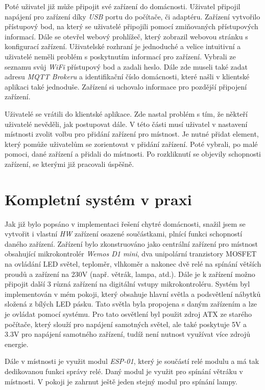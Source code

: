 Poté uživatel již může připojit své zařízení do domácnosti.
Uživatel připojil napájení pro zařízení díky \emph{USB} portu do počítače, či adaptéru.
Zařízení vytvořilo přístupový bod, na který se uživatelé připojili pomocí zmiňovaných přístupových informací.
Dále se otevřel webový prohlížeč, který zobrazil webovou stránku s konfigurací zařízení.
Uživatelské rozhraní je jednoduché a velice intuitivní a uživatelé neměli problém s poskytnutím informací pro zařízení.
Vybrali ze seznamu svůj \emph{WiFi} přístupový bod a zadali heslo.
Dále zde museli také zadat adresu \emph{MQTT Brokeru} a identifikační číslo domácnosti, které našli v klientské aplikaci také jednoduše.
Zařízení si uchovalo informace pro pozdější připojení zařízení.

Uživatelé se vrátili do klientské aplikace.
Zde nastal problém s tím, že někteří uživatelé nevěděli, jak postupovat dále.
V této části musí uživatel v nastavení místnosti zvolit volbu pro přidání zařízení pro místnost.
Je nutné přidat element, který pomůže uživatelům se zorientovat v přidání zařízení.
Poté vybrali, po malé pomoci, dané zařízení a přidali do místnosti.
Po rozkliknutí se objevily schopnosti zařízení, se kterými již pracovali úspěšně.

\section{Kompletní systém v praxi}
\label{testovani:praxe}
Jak již bylo popsáno v implementaci řešení chytré domácnosti, snažil jsem se vytvořit i vlastní \emph{HW} zařízení osazené součástkami, plnící funkci schopností daného zařízení.
Zařízení bylo zkonstruováno jako centrální zařízení pro místnost obsahující mikrokontrolér \emph{Wemos D1 mini}, dva unipolární tranzistory MOSFET na ovládání LED světel, teploměr, vlhkoměr a nakonec dvě relé na spínání větších proudů a zařízení na 230V (např. větrák, lampa, atd.).
Dále je k zařízení možno připojit další 3 různá zařízení na digitální vstupy mikrokontroléru.
Systém byl implementován v mém pokoji, který obsahuje hlavní světla a podsvětlení nábytků složená z bílých LED pásku.
Tato světla byla propojena s daným zařízením a lze je ovládat pomocí systému.
Pro tato osvětlení byl použit zdroj ATX ze starého počítače, který slouží pro napájení samotných světel, ale také poskytuje 5V a 3.3V pro napájení samotného zařízení, tudíž není nutnost využívat více zdrojů energie.

Dále v místnosti je využit modul \emph{ESP-01}, který je součástí relé modulu a má tak dedikovanou funkci správy relé.
Daný modul je využit pro spínání větráku v místnosti.
V pokoji je zahrnut ještě jeden stejný modul pro spínání lampy.

